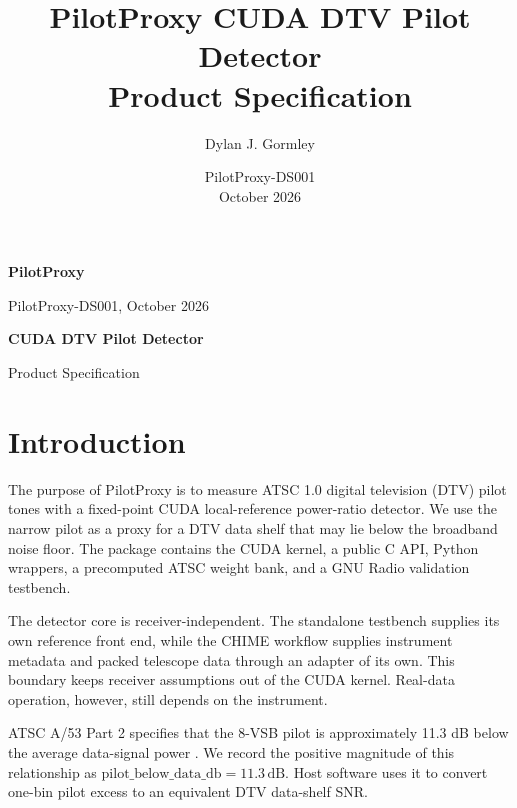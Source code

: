 \documentclass[10pt,letterpaper]{article}
\title{PilotProxy CUDA DTV Pilot Detector\\Product Specification}
\author{Dylan J. Gormley}
\date{PilotProxy-DS001 \\ October 2026}
\newcommand{\dB}{\,\mathrm{dB}}
\begin{document}
\thispagestyle{fancy}
{\sffamily
\begin{minipage}[t]{0.39\textwidth}
  {\fontsize{24}{26}\selectfont\bfseries\color{PilotProxyRed}PilotProxy}\par
  {\small PilotProxy-DS001, October 2026}
\end{minipage}
\hfill
\begin{minipage}[t]{0.58\textwidth}
  \raggedleft
  {\fontsize{18}{20}\selectfont\bfseries CUDA DTV Pilot Detector}\par
  {\small Product Specification}
\end{minipage}
}

\vspace{0.14in}

\begin{minipage}[t]{0.48\textwidth}
\section*{Introduction}
The purpose of PilotProxy is to measure ATSC 1.0 digital television (DTV) pilot tones with a fixed-point CUDA local-reference power-ratio detector. We use the narrow pilot as a proxy for a DTV data shelf that may lie below the broadband noise floor. The package contains the CUDA kernel, a public C API, Python wrappers, a precomputed ATSC weight bank, and a GNU Radio validation testbench.

The detector core is receiver-independent. The standalone testbench supplies its own reference front end, while the CHIME workflow supplies instrument metadata and packed telescope data through an adapter of its own. This boundary keeps receiver assumptions out of the CUDA kernel. Real-data operation, however, still depends on the instrument.

ATSC A/53 Part 2 specifies that the 8-VSB pilot is approximately 11.3 dB below the average data-signal power \cite{atsc_a53_part2_2011}. We record the positive magnitude of this relationship as \(\mathrm{pilot\_below\_data\_db}=11.3\dB\). Host software uses it to convert one-bin pilot excess to an equivalent DTV data-shelf SNR.


\end{minipage}
\end{document}
